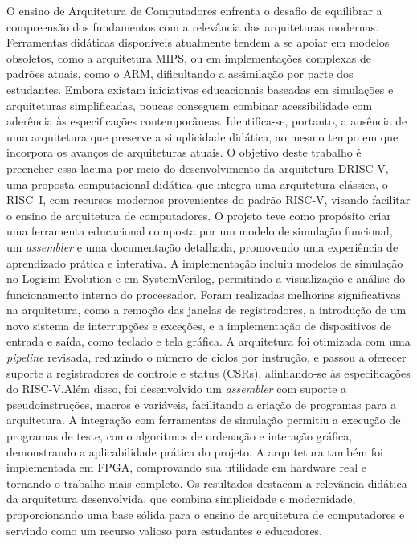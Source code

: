\documentclass[
	12pt,				%
	openright,			%
	oneside,			%
	a4paper,			%
	english,			%
	french,				%
	spanish,			%
	brazil,				%
	]{abntex2}
\begin{document}
O ensino de Arquitetura de Computadores enfrenta o desafio de equilibrar a compreensão dos fundamentos com a relevância das arquiteturas modernas. Ferramentas didáticas disponíveis atualmente tendem a se apoiar em modelos obsoletos, como a arquitetura MIPS, ou em implementações complexas de padrões atuais, como o ARM, dificultando a assimilação por parte dos estudantes. Embora existam iniciativas educacionais baseadas em simulações e arquiteturas simplificadas, poucas conseguem combinar acessibilidade com aderência às especificações contemporâneas. Identifica-se, portanto, a ausência de uma arquitetura que preserve a simplicidade didática, ao mesmo tempo em que incorpora os avanços de arquiteturas atuais. O objetivo deste trabalho é preencher essa lacuna por meio do desenvolvimento da arquitetura DRISC-V, uma proposta computacional didática que integra uma arquitetura clássica, o RISC~I, com recursos modernos provenientes do padrão RISC-V, visando facilitar o ensino de arquitetura de computadores. O projeto teve como propósito criar uma ferramenta educacional composta por um modelo de simulação funcional, um \textit{assembler} e uma documentação detalhada, promovendo uma experiência de aprendizado prática e interativa. A implementação incluiu modelos de simulação no Logisim Evolution e em SystemVerilog, permitindo a visualização e análise do funcionamento interno do processador. Foram realizadas melhorias significativas na arquitetura, como a remoção das janelas de registradores, a introdução de um novo sistema de interrupções e exceções, e a implementação de dispositivos de entrada e saída, como teclado e tela gráfica. A arquitetura foi otimizada com uma \textit{pipeline} revisada, reduzindo o número de ciclos por instrução, e passou a oferecer suporte a registradores de controle e status (CSRs), alinhando-se às especificações do RISC-V.Além disso, foi desenvolvido um \textit{assembler} com suporte a pseudoinstruções, macros e variáveis, facilitando a criação de programas para a arquitetura. A integração com ferramentas de simulação permitiu a execução de programas de teste, como algoritmos de ordenação e interação gráfica, demonstrando a aplicabilidade prática do projeto. A arquitetura também foi implementada em FPGA, comprovando sua utilidade em hardware real e tornando o trabalho mais completo. Os resultados destacam a relevância didática da arquitetura desenvolvida, que combina simplicidade e modernidade, proporcionando uma base sólida para o ensino de arquitetura de computadores e servindo como um recurso valioso para estudantes e educadores.
\end{document}
